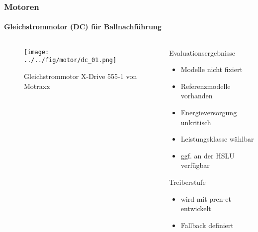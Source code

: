 \begin{frame}
	\frametitle{Motoren \hfill{} \footnotesize \group}
	\framesubtitle{Gleichstrommotor (DC) für Ballnachführung}
	\begin{columns}
		\begin{column}{0.5\textwidth}
			\begin{figure}
				\centering
				\texttt{[image: ../../fig/motor/dc\_01.png]}
				\caption{Gleichstrommotor X-Drive 555-1 von Motraxx}
			\end{figure}
		\end{column}
		\begin{column}{0.5\textwidth}
			\begin{block}{Evaluationsergebnisse}
				\begin{itemize}
					\item Modelle nicht fixiert
					\item Referenzmodelle vorhanden
					\item Energieversorgung unkritisch
					\item Leistungsklasse wählbar
					\item ggf. an der HSLU verfügbar
				\end{itemize}
			\end{block}
			\begin{exampleblock}{Treiberstufe}
				\begin{itemize}
					\item wird mit pren-et entwickelt
					\item Fallback definiert
				\end{itemize}
			\end{exampleblock}
		\end{column}
	\end{columns}
\end{frame}


